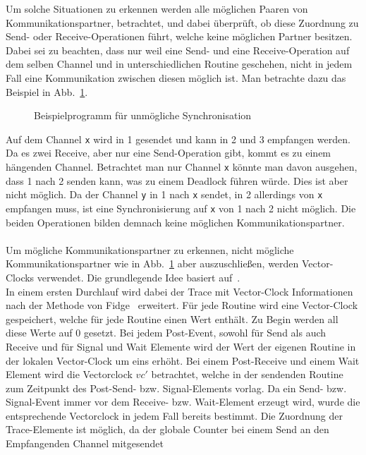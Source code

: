 Um solche Situationen zu erkennen werden alle möglichen Paaren von Kommunikationspartner,
betrachtet, und dabei überprüft, ob diese Zuordnung zu Send- oder Receive-Operationen führt, 
welche keine möglichen Partner besitzen. Dabei sei zu beachten, dass nur weil eine Send- und eine 
Receive-Operation auf dem selben Channel und in unterschiedlichen Routine geschehen, nicht 
in jedem Fall eine Kommunikation zwischen diesen möglich ist. Man betrachte dazu das Beispiel in 
Abb.~\ref{Chap:Analyze-Sec:Channel-SubSec:Dangling-Fig:NoSync}.
\begin{figure}[h!]
  
  \caption{Beispielprogramm für unmögliche Synchronisation}
  \label{Chap:Analyze-Sec:Channel-SubSec:Dangling-Fig:NoSync}
\end{figure}
Auf dem Channel \texttt{x} wird in 1 gesendet und kann in 2 und 3 empfangen werden. Da es zwei Receive, 
aber nur eine Send-Operation gibt, kommt es zu einem hängenden Channel. Betrachtet man nur 
Channel \texttt{x} könnte man davon ausgehen, dass 1 nach 2 senden kann, was zu einem Deadlock
führen würde. Dies ist aber nicht möglich. Da der Channel \texttt{y} in 1 nach \texttt{x} sendet, 
in 2 allerdings von \texttt{x} empfangen muss, ist eine Synchronisierung auf \texttt{x} von 1 nach 
2 nicht möglich. Die beiden Operationen bilden demnach keine möglichen Kommunikationspartner.\\\\
Um mögliche Kommunikationspartner zu erkennen, nicht mögliche Kommunikationspartner wie in 
Abb.~\ref{Chap:Analyze-Sec:Channel-SubSec:Dangling-Fig:NoSync} aber auszuschließen, werden
Vector-Clocks verwendet. Die grundlegende Idee basiert auf~\cite{PPDP18}.\\
In einem ersten Durchlauf wird dabei der Trace mit Vector-Clock Informationen nach der Methode 
von Fidge~\cite{Fidge} erweitert. Für jede Routine 
wird eine Vector-Clock gespeichert, welche für jede Routine einen Wert enthält. Zu Begin werden 
all diese Werte auf 0 gesetzt. Bei jedem Post-Event, sowohl für Send als auch Receive und für 
Signal und Wait Elemente wird der Wert der eigenen Routine in der lokalen Vector-Clock um eins 
erhöht. Bei einem Post-Receive und einem Wait Element wird die Vectorclock $vc'$ betrachtet, 
welche in der sendenden Routine zum Zeitpunkt des Post-Send- bzw. Signal-Elements vorlag. 
Da ein Send- bzw. Signal-Event immer vor dem Receive- bzw. Wait-Element erzeugt wird, wurde 
die entsprechende Vectorclock in jedem Fall bereits bestimmt. Die Zuordnung der Trace-Elemente 
ist möglich, da der globale Counter bei einem Send an den Empfangenden Channel mitgesendet 
